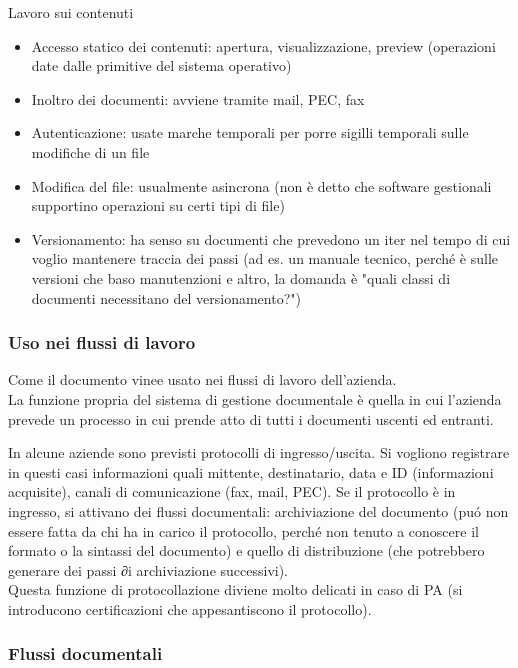 Lavoro sui contenuti

\begin{itemize}

\item
  Accesso statico dei contenuti: apertura, visualizzazione, preview
  (operazioni date dalle primitive del sistema operativo)
\item
  Inoltro dei documenti: avviene tramite mail, PEC, fax
\item
  Autenticazione: usate marche temporali per porre sigilli temporali
  sulle modifiche di un file
\item
  Modifica del file: usualmente asincrona (non \`e detto che software
  gestionali supportino operazioni su certi tipi di file)
\item
  Versionamento: ha senso su documenti che prevedono un iter nel tempo
  di cui voglio mantenere traccia dei passi (ad es. un manuale tecnico,
  perch\'e \`e sulle versioni che baso manutenzioni e altro, la domanda \`e
  "quali classi di documenti necessitano del versionamento?")
\end{itemize}

\subsubsection{Uso nei flussi di lavoro}

Come il documento vinee usato nei flussi di lavoro dell'azienda.\\
La funzione propria del sistema di gestione documentale \`e quella in cui
l'azienda prevede un processo in cui prende atto di tutti i documenti
uscenti ed entranti.

In alcune aziende sono previsti protocolli di ingresso/uscita. Si
vogliono registrare in questi casi informazioni quali mittente,
destinatario, data e ID (informazioni acquisite), canali di
comunicazione (fax, mail, PEC). Se il protocollo \`e in ingresso, si
attivano dei flussi documentali: archiviazione del documento (pu\'o non
essere fatta da chi ha in carico il protocollo, perch\'e non tenuto a
conoscere il formato o la sintassi del documento) e quello di
distribuzione (che potrebbero generare dei passi ∂i archiviazione
successivi).\\
Questa funzione di protocollazione diviene molto delicati in caso di PA
(si introducono certificazioni che appesantiscono il protocollo).

\subsubsection{Flussi documentali}

